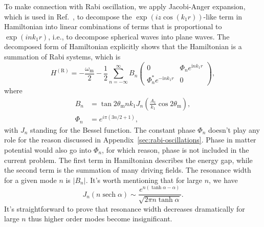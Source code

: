 \documentclass[%
reprint,
 amsmath,amssymb,
 aps,
]{revtex4-1}
\newcommand{\sech}[1]{{\operatorname{sech}{#1}}}
\begin{document}
To make connection with Rabi oscillation, we apply Jacobi-Anger expansion, which is used in Ref.~, to decompose the $\exp\left( i z \cos\left(k_1 r \right) \right)$-like term in Hamiltonian into linear combinations of terms that is proportional to $\exp\left(i n k_1 r \right)$, i.e., to decompose spherical waves into plane waves. The decomposed form of Hamiltonian explicitly shows that the Hamiltonian is a summation of Rabi systems, which is
\begin{equation*}
    H^{(\mathrm{R})} = 
    -\frac{\omega_{\mathrm{m}}}{2} 
    -  \frac{1}{2} \sum_{n=-\infty}^\infty B_n \begin{pmatrix}
    0 &  \Phi_n e^{\mathrm i n k_1  r} \\
     \Phi_n^* e^{ - \mathrm i n k_1 r} & 0
    \end{pmatrix},
\end{equation*}
where
\begin{align*}
    B_n &= \tan 2\theta_{\mathrm m} n k_1 J_{n} \left( \frac{A_1}{k_1}\cos 2\theta_{\mathrm m} \right),\\
    \Phi_n &= e^{i\pi (3n/2+1)},
\end{align*}
with $J_n$ standing for the Bessel function.
The constant phase $\Phi_n$ doesn't play any role for the reason discussed in Appendix~\ref{sec:rabi-oscillations}. Phase in matter potential would also go into $\Phi_n$, for which reason, phase is not included in the current problem. The first term in Hamiltonian describes the energy gap, while the second term is the summation of many driving fields. The resonance width for a given mode $n$ is $\lvert B_{n}\rvert$. It's worth mentioning that for large $n$, we have~\cite{Ploumistakis20092897}
\begin{equation}
J_n(n \sech \alpha) \sim \frac{ e^{n(\tanh\alpha - \alpha)} }{\sqrt{ 2\pi n \tanh \alpha } }.
\end{equation}
It's straightforward to prove that resonance width decreases dramatically for large $n$ thus higher order modes become insignificant.
\end{document}
